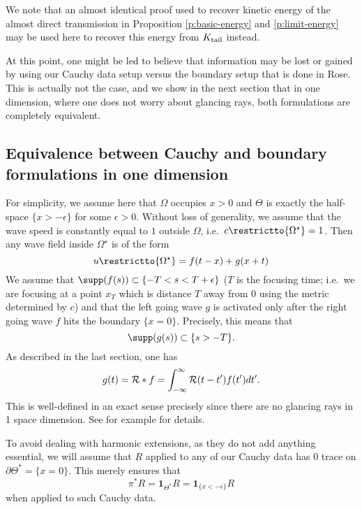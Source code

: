 \documentclass[10pt]{article}
\theoremstyle{plain}
\theoremstyle{definition}
\theoremstyle{remark}
\numberwithin{theorem}{section}
\numberwithin{example}{section}
\numberwithin{equation}{section}
\numberwithin{figure}{section}
\def\beq{\begin{equation} }
\def\eeq{\end{equation}}
\def \R{\mathcal{R}}
\newcommand\tail{_{\textup{tail}}}
\begin{document}
\begin{rem}
We note that an almost identical proof used to recover kinetic energy of the almost direct transmission in Proposition \ref{p:basic-energy} and \ref{p:limit-energy} may be used here to recover this energy from $K\tail$ instead.
\end{rem}

At this point, one might be led to believe that information may be lost or gained by using our Cauchy data setup versus the boundary setup that is done in Rose. This is actually not the case, and we show in the next section that in one dimension, where one does not worry about glancing rays, both formulations are completely
equivalent.

\subsection{Equivalence between Cauchy and boundary formulations in one dimension}

For simplicity, we assume here that $\Omega$ occupies $x>0$ and $\Theta$ is exactly the half-space $\{ x>-\epsilon\}$ for some $\epsilon > 0$. Without loss of generality, we assume that the wave speed is constantly equal to $1$ outside $\Omega$, i.e.~$c\restrictto{\Omega^\star} =1$. Then any wave field inside $\Omega^\star$ is of the form
\beq{
u \restrictto{\Omega^\star} = f(t-x) + g(x+t)
}\eeq
We assume that $\supp(f(s))\subset \{ -T < s < T+\epsilon \}$ ($T$ is the focusing time; i.e.~we are focusing at a point $x_T$ which is distance $T$ away from $0$ using the metric determined by $c$) and that the left going wave $g$ is activated only after the right going wave $f$ hits the boundary $\{ x =0 \}.$ Precisely, this means that
$$ \supp(g(s)) \subset \{ s > -T \}.$$
As described in the last section, one has
\beq{\label{eq: CtoB g is related to f}
 g(t) = \R \ast f = \int_{-\infty}^{\infty} \R(t-t')f(t')dt'.
 }\eeq
This is well-defined in an exact sense precisely since there are no glancing rays in 1 space dimension. See for example \cite{AR02} for details.

To avoid dealing with harmonic extensions, as they do not add anything essential, we will assume that $R$ applied to any of our Cauchy data has $0$ trace on $\partial \Theta^*= \{ x=0\}$. This merely ensures that
$$ \pi^*R = \mathbf{1}_{\Theta^*}R = \mathbf{1}_{\{{x<-\epsilon}\}}R$$
when applied to such Cauchy data.
\end{document}
